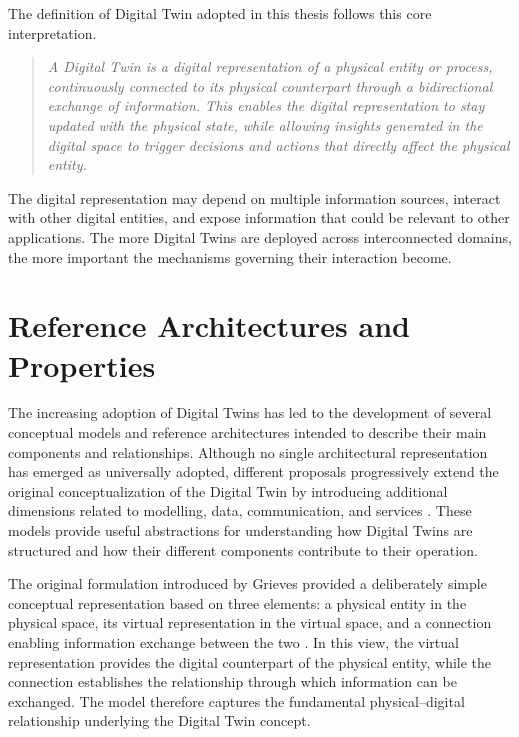 The definition of Digital Twin adopted in this thesis follows this core interpretation.

\begin{quote}
\textit{A Digital Twin is a digital representation of a physical entity or process, continuously connected to its physical counterpart through a bidirectional exchange of information. This enables the digital representation to stay updated with the physical state, while allowing insights generated in the digital space to trigger decisions and actions that directly affect the physical entity.}
\end{quote}

The digital representation may depend on multiple information sources, interact with other digital entities, and expose information that could be relevant to other applications. The more Digital Twins are deployed across interconnected domains, the more important the mechanisms governing their interaction become.

\section{Reference Architectures and Properties}
\label{sec:ref-arch}

The increasing adoption of Digital Twins has led to the development of several conceptual models and reference architectures intended to describe their main components and relationships. Although no single architectural representation has emerged as universally adopted, different proposals progressively extend the original conceptualization of the Digital Twin by introducing additional dimensions related to modelling, data, communication, and services \cite{qi2021,tao2022,liu2021}. These models provide useful abstractions for understanding how Digital Twins are structured and how their different components contribute to their operation.

The original formulation introduced by Grieves provided a deliberately simple conceptual representation based on three elements: a physical entity in the physical space, its virtual representation in the virtual space, and a connection enabling information exchange between the two \cite{grieves2014digital}. In this view, the virtual representation provides the digital counterpart of the physical entity, while the connection establishes the relationship through which information can be exchanged. The model therefore captures the fundamental physical--digital relationship underlying the Digital Twin concept.

